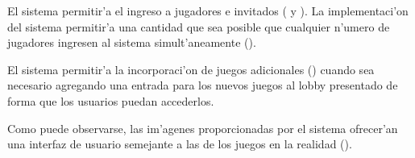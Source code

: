 El sistema permitir'a el ingreso a jugadores e invitados ( y ). La implementaci'on del sistema permitir'a una cantidad que sea posible que cualquier n'umero de jugadores ingresen al sistema simult'aneamente ().

El sistema permitir'a la incorporaci'on de juegos adicionales () cuando sea necesario agregando una entrada para los nuevos juegos al lobby presentado de forma que los usuarios puedan accederlos.
\clearpage


Como puede observarse, las im'agenes proporcionadas por el sistema ofrecer'an una interfaz de usuario semejante a las de los juegos en la realidad ().

